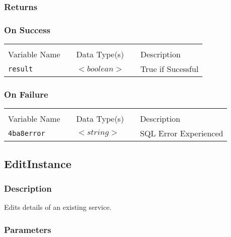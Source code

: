 \subsubsection{Returns}

\subsubsection{On Success}

\begin{tabular}{lllll}
				&	&	&	&	\\
Variable Name	&		&	Data Type(s)		&	&	Description	\\
\verb!result! & \hspace{15mm} & $<boolean>$ & \hspace{15mm} & True if Sucessful \\
\end{tabular}

\subsubsection{On Failure}

\begin{tabular}{lllll}
				&	&	&	&	\\
Variable Name	&		&	Data Type(s)		&	&	Description	\\
\verb!4ba8error! & \hspace{15mm} & $<string>$ & \hspace{15mm} & SQL Error Experienced \\
\end{tabular}


\subsection{EditInstance}

\subsubsection{Description}

Edits details of an existing service.

\subsubsection{Parameters}

